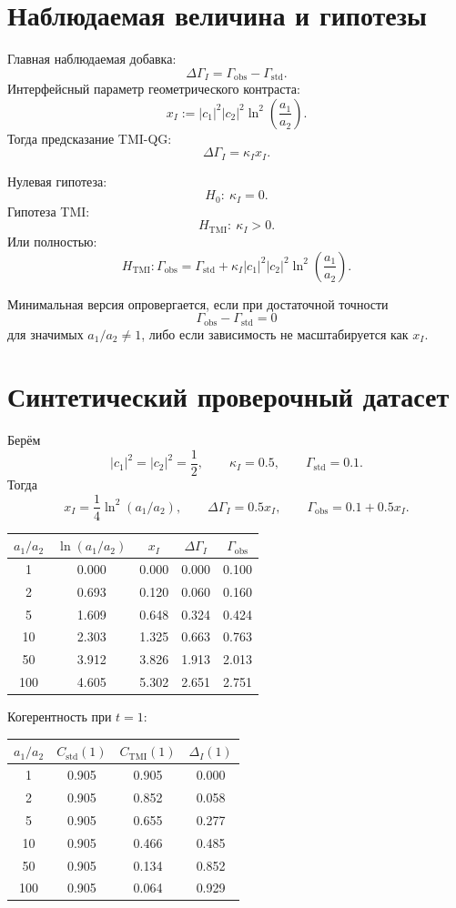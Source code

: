 \documentclass[12pt,a4paper]{article}
\newcommand{\std}{\mathrm{std}}
\newcommand{\obs}{\mathrm{obs}}
\begin{document}
\section{Наблюдаемая величина и гипотезы}

Главная наблюдаемая добавка:
\[
\Delta\Gamma_I=\Gamma_{\obs}-\Gamma_{\std}.
\]
Интерфейсный параметр геометрического контраста:
\[
\boxed{
x_I:=|c_1|^2|c_2|^2
\ln^2\left(\frac{a_1}{a_2}\right).
}
\]
Тогда предсказание TMI-QG:
\[
\boxed{
\Delta\Gamma_I=\kappa_I x_I.
}
\]

Нулевая гипотеза:
\[
\boxed{H_0:\ \kappa_I=0.}
\]
Гипотеза TMI:
\[
\boxed{H_{\mathrm{TMI}}:\ \kappa_I>0.}
\]
Или полностью:
\[
\boxed{
H_{\mathrm{TMI}}:
\Gamma_{\obs}
=
\Gamma_{\std}
+
\kappa_I |c_1|^2|c_2|^2
\ln^2\left(\frac{a_1}{a_2}\right).
}
\]

Минимальная версия опровергается, если при достаточной точности
\[
\Gamma_{\obs}-\Gamma_{\std}=0
\]
для значимых \(a_1/a_2\neq1\), либо если зависимость не масштабируется как \(x_I\).

\section{Синтетический проверочный датасет}

Берём
\[
|c_1|^2=|c_2|^2=\frac12,
\qquad
\kappa_I=0.5,
\qquad
\Gamma_{\std}=0.1.
\]
Тогда
\[
x_I=\frac14\ln^2(a_1/a_2),
\qquad
\Delta\Gamma_I=0.5x_I,
\qquad
\Gamma_{\obs}=0.1+0.5x_I.
\]

\begin{center}
\begin{tabular}{ccccc}
\toprule
\(a_1/a_2\) & \(\ln(a_1/a_2)\) & \(x_I\) & \(\Delta\Gamma_I\) & \(\Gamma_{\obs}\)\\
\midrule
1 & 0.000 & 0.000 & 0.000 & 0.100\\
2 & 0.693 & 0.120 & 0.060 & 0.160\\
5 & 1.609 & 0.648 & 0.324 & 0.424\\
10 & 2.303 & 1.325 & 0.663 & 0.763\\
50 & 3.912 & 3.826 & 1.913 & 2.013\\
100 & 4.605 & 5.302 & 2.651 & 2.751\\
\bottomrule
\end{tabular}
\end{center}

Когерентность при \(t=1\):
\begin{center}
\begin{tabular}{cccc}
\toprule
\(a_1/a_2\) & \(C_{\std}(1)\) & \(C_{\mathrm{TMI}}(1)\) & \(\Delta_I(1)\)\\
\midrule
1 & 0.905 & 0.905 & 0.000\\
2 & 0.905 & 0.852 & 0.058\\
5 & 0.905 & 0.655 & 0.277\\
10 & 0.905 & 0.466 & 0.485\\
50 & 0.905 & 0.134 & 0.852\\
100 & 0.905 & 0.064 & 0.929\\
\bottomrule
\end{tabular}
\end{center}
\end{document}
